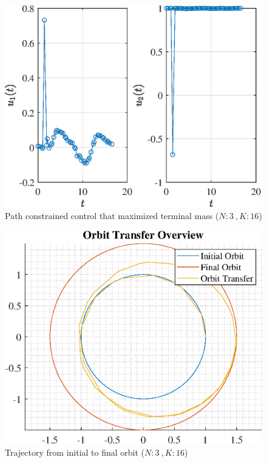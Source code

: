 \documentclass[]{article}
\begin{document}
\begin{figure}
	\centering
	\includegraphics[scale=0.75]{path_N3_K16_C3_mf.eps}
	\caption{Path constrained control that maximized terminal mass (\(N:3\ , K:16\))}
	\label{fig:path_N3_K16_C3_mf}
\end{figure}
\begin{figure}
	\centering
	\includegraphics[scale=0.75]{orbit_N3_K16_C3_mf.eps}
	\caption{Trajectory from initial to final orbit (\(N:3\ , K:16\))}
	\label{fig:orbit_N3_K16_C3_mf}
\end{figure}
\end{document}
